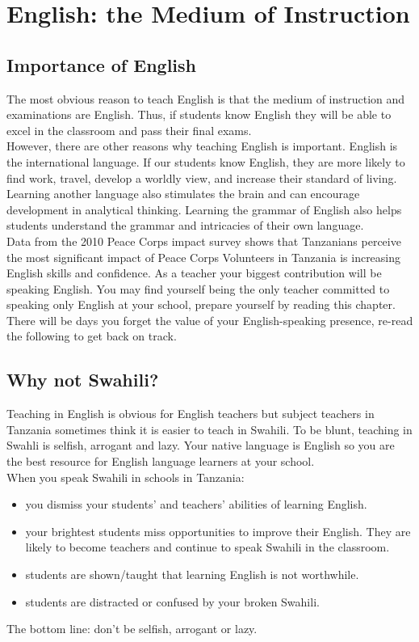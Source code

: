 \chapter{English: the Medium of Instruction}
\section{Importance of English}

The most obvious reason to teach English is that the medium of instruction
and examinations are English. Thus, if students know English they
will be able to excel in the classroom and pass their final exams.\\


However, there are other reasons why teaching English is important.
English is the international language. If our students know English,
they are more likely to find work, travel, develop a worldly view,
and increase their standard of living. Learning another language also
stimulates the brain and can encourage development in analytical thinking.
Learning the grammar of English also helps students understand the
grammar and intricacies of their own language.\\


Data from the 2010 Peace Corps impact survey shows that Tanzanians
perceive the most significant impact of Peace Corps Volunteers in
Tanzania is increasing English skills and confidence. As a teacher
your biggest contribution will be speaking English. You may find yourself
being the only teacher committed to speaking only English at your
school, prepare yourself by reading this chapter. There will be days
you forget the value of your English-speaking presence, re-read the
following to get back on track.


\section{Why not Swahili?}

Teaching in English is obvious for English teachers but subject teachers
in Tanzania sometimes think it is easier to teach in Swahili. To be
blunt, teaching in Swahli is selfish, arrogant and lazy. Your native
language is English so you are the best resource for English language
learners at your school.\\


When you speak Swahili in schools in Tanzania:
\begin{itemize}
\item you dismiss your students' and teachers' abilities of learning English. 
\item your brightest students miss opportunities to improve their English.
They are likely to become teachers and continue to speak Swahili in
the classroom.
\item students are shown/taught that learning English is not worthwhile.
\item students are distracted or confused by your broken Swahili. 
\end{itemize}
The bottom line: don't be selfish, arrogant or lazy.

